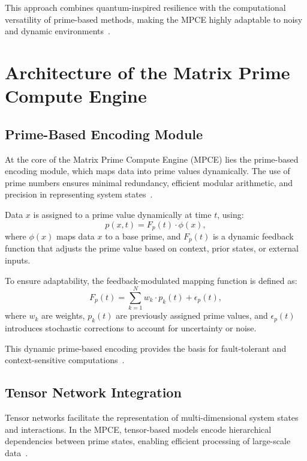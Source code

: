\documentclass{article}
\theoremstyle{plain}
\begin{document}
This approach combines quantum-inspired resilience with the computational versatility of prime-based methods, making the MPCE highly adaptable to noisy and dynamic environments~\cite{haroche2013nobel, wang2021quantum}.

\section{Architecture of the Matrix Prime Compute Engine}

\subsection{Prime-Based Encoding Module}

At the core of the Matrix Prime Compute Engine (MPCE) lies the prime-based encoding module, which maps data into prime values dynamically. The use of prime numbers ensures minimal redundancy, efficient modular arithmetic, and precision in representing system states~\cite{hardy2008introduction, riemann1859hypothesis}.

Data \( x \) is assigned to a prime value dynamically at time \( t \), using:
\begin{equation}
    p(x, t) = F_p(t) \cdot \phi(x),
\end{equation}
where \( \phi(x) \) maps data \( x \) to a base prime, and \( F_p(t) \) is a dynamic feedback function that adjusts the prime value based on context, prior states, or external inputs.

To ensure adaptability, the feedback-modulated mapping function is defined as:
\begin{equation}
    F_p(t) = \sum_{k=1}^N w_k \cdot p_k(t) + \epsilon_p(t),
\end{equation}
where \( w_k \) are weights, \( p_k(t) \) are previously assigned prime values, and \( \epsilon_p(t) \) introduces stochastic corrections to account for uncertainty or noise.

This dynamic prime-based encoding provides the basis for fault-tolerant and context-sensitive computations~\cite{shor1994algorithms, haroche2013nobel}.

\subsection{Tensor Network Integration}

Tensor networks facilitate the representation of multi-dimensional system states and interactions. In the MPCE, tensor-based models encode hierarchical dependencies between prime states, enabling efficient processing of large-scale data~\cite{white1992tensor, vidal2003efficient}.
\end{document}
